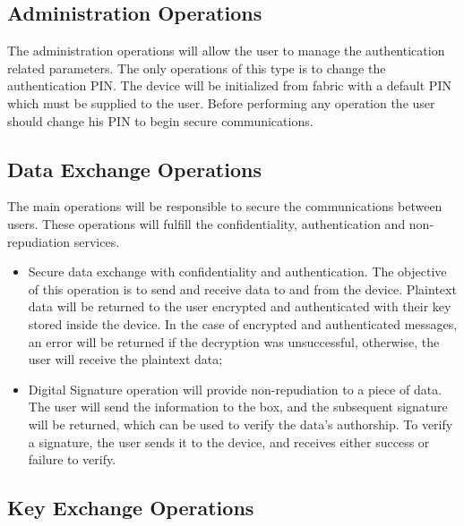 \subsection{Administration Operations} \label{chap:arch:ops:administration}

The administration operations will allow the user to manage the authentication related parameters.
The only operations of this type is to change the authentication PIN. The device will be initialized from fabric with a default PIN which must be supplied to the user. Before performing any operation the user should change his PIN to begin secure communications.

\subsection{Data Exchange Operations}  \label{chap:arch:ops:data}

The main operations will be responsible to secure the communications between users. These operations will fulfill the confidentiality, authentication and non-repudiation services.

\begin{itemize}
    \item Secure data exchange with confidentiality and authentication. The objective of this operation is to send and receive data to and from the device. Plaintext data will be returned to the user encrypted and authenticated with their key stored inside the device. In the case of encrypted and authenticated messages, an error will be returned if the decryption was unsuccessful, otherwise, the user will receive the plaintext data;
    \item Digital Signature operation will provide non-repudiation to a piece of data. The user will send the information to the box, and the subsequent signature will be returned, which can be used to verify the data's authorship. To verify a signature, the user sends it to the device, and receives either success or failure to verify.
\end{itemize}

\subsection{Key Exchange Operations}  \label{chap:arch:ops:key}

